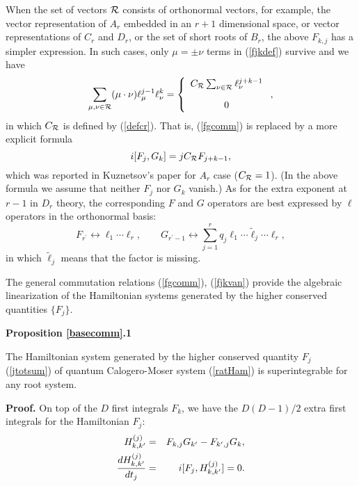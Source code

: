 \documentclass[a4paper,12pt]{article}
\begin{document}
When the set of vectors ${\cal R}$ consists of orthonormal vectors,
for example, the vector representation of $A_r$ embedded in  an
$r+1$ dimensional space,
or vector representations of $C_r$ and $D_r$, or the set of short roots
of $B_r$, the above $F_{k,j}$ has a simpler expression.  In such cases,
only $\mu=\pm\nu$ terms in (\ref{fjkdef}) survive and we have
\begin{equation}
\sum_{\mu,\nu\in{\cal R}}
(\mu\cdot\nu)\ell_\mu^{j-1}\ell^k_\nu=
\left\{\begin{array}{c}
C_{\cal R}\sum_{\nu\in{\cal R}}
\ell_\nu^{j+k-1}\\[10pt]
0
\end{array}
\right. ,
\end{equation}
in which $C_{\cal R}$ is defined by (\ref{defcr}).
That is, (\ref{fgcomm}) is replaced by a more explicit formula
\begin{equation}
i[F_j,G_k]=jC_{\cal R}F_{j+k-1},
\label{fgsimp}
\end{equation}
which was reported in Kuznetsov's paper for $A_r$ case \cite{Kuz}
($C_{\cal R}=1$).
(In the above formula we assume that neither $F_j$ nor $G_k$ vanish.)
As for the extra exponent at $r-1$ in $D_r$ theory, the corresponding $F$
and
$G$ operators are best expressed by $\ell$ operators in the orthonormal
basis:
\begin{equation}
F_{r^\prime}\leftrightarrow \ell_1\cdots\ell_r,\qquad
G_{r^\prime-1}\leftrightarrow
\sum_{j=1}^r q_j\ell_1\cdots\tilde{\ell}_j\cdots\ell_r,
\end{equation}
in which $\tilde{\ell}_j$ means that the factor is missing.


\bigskip
The general commutation relations (\ref{fgcomm}), (\ref{fjkvan}) provide
the algebraic linearization
of the Hamiltonian systems generated by the higher
conserved quantities $\{F_j\}$.

\bigskip
{\bf Proposition \ref{basecomm}.1}


The Hamiltonian system generated by the higher conserved
quantity $F_j$ (\ref{jtotsum}) of quantum Calogero-Moser
system (\ref{ratHam}) is superintegrable for
any root system.

{\bf Proof.}
        On top of  the $D$ first integrals $F_{k}$, we have
the $D(D-1)/2$ extra first integrals for the Hamiltonian $F_j$:
\begin{eqnarray}
H_{k,k'}^{(j)}&=&F_{k,j}G_{k'}-F_{k',j}G_{k},\label{defHjkkp}\\
{d{H}_{k,k'}^{(j)}\over{dt_j}}&=
&i[F_j, H_{k,k'}^{(j)}]=0.\label{Hjkjcons}
\end{eqnarray}
\end{document}
